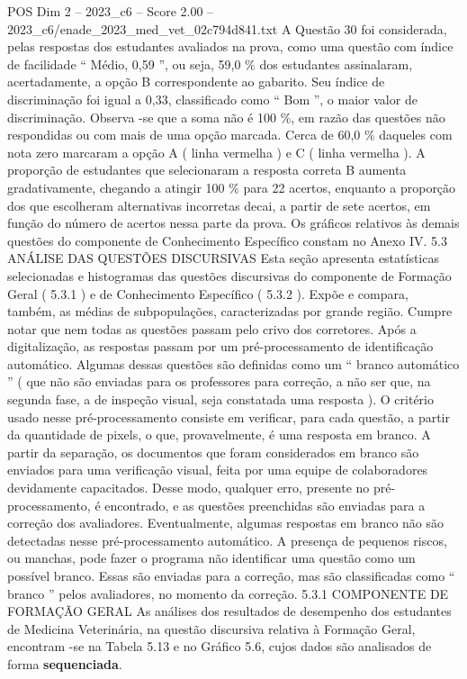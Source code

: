 \begin{textsample}{POS Dim 2 – 2023\_c6 – Score 2.00 – 2023\_c6/enade\_2023\_med\_vet\_02c794d841.txt}
A Questão 30 foi considerada, pelas respostas dos estudantes avaliados na prova, como uma questão com índice de facilidade “ Médio, 0,59 ”, ou seja, 59,0 \% dos estudantes assinalaram, acertadamente, a opção B correspondente ao gabarito.
Seu índice de discriminação foi igual a 0,33, classificado como “ Bom ”, o maior valor de discriminação.
Observa -se que a soma não é 100 \%, em razão das questões não respondidas ou com mais de uma opção marcada.
Cerca de 60,0 \% daqueles com nota zero marcaram a opção A ( linha vermelha ) e C ( linha vermelha ).
A proporção de estudantes que selecionaram a resposta correta B aumenta gradativamente, chegando a atingir 100 \% para 22 acertos, enquanto a proporção dos que escolheram alternativas incorretas decai, a partir de sete acertos, em função do número de acertos nessa parte da prova.
Os gráficos relativos às demais questões do componente de Conhecimento Específico constam no Anexo IV. 5.3 ANÁLISE DAS QUESTÕES DISCURSIVAS Esta seção apresenta estatísticas selecionadas e histogramas das questões discursivas do componente de Formação Geral ( 5.3.1 ) e de Conhecimento Específico ( 5.3.2 ).
Expõe e compara, também, as médias de subpopulações, caracterizadas por grande região.
Cumpre notar que nem todas as questões passam pelo crivo dos corretores.
Após a digitalização, as respostas passam por um pré-processamento de identificação automático.
Algumas dessas questões são definidas como um “ branco automático ” ( que não são enviadas para os professores para correção, a não ser que, na segunda fase, a de inspeção visual, seja constatada uma resposta ).
O critério usado nesse pré-processamento consiste em verificar, para cada questão, a partir da quantidade de pixels, o que, provavelmente, é uma resposta em branco.
A partir da separação, os documentos que foram considerados em branco são enviados para uma verificação visual, feita por uma equipe de colaboradores devidamente capacitados.
Desse modo, qualquer erro, presente no pré-processamento, é encontrado, e as questões preenchidas são enviadas para a correção dos avaliadores.
Eventualmente, algumas respostas em branco não são detectadas nesse pré-processamento automático.
A presença de pequenos riscos, ou manchas, pode fazer o programa não identificar uma questão como um possível branco.
Essas são enviadas para a correção, mas são classificadas como “ branco ” pelos avaliadores, no momento da correção. 5.3.1 COMPONENTE DE FORMAÇÃO GERAL As análises dos resultados de desempenho dos estudantes de Medicina Veterinária, na questão discursiva relativa à Formação Geral, encontram -se na Tabela 5.13 e no Gráfico 5.6, cujos dados são analisados de forma \textbf{sequenciada}.

\end{textsample}
